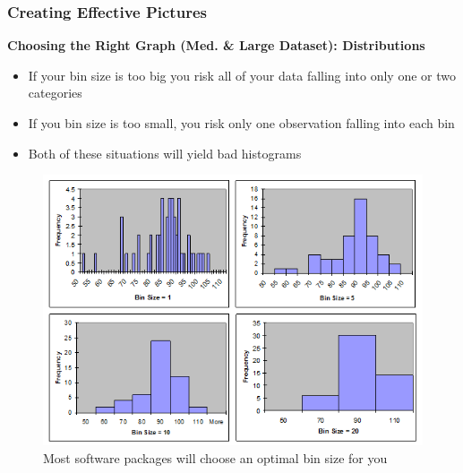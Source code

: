 \documentclass{beamer}
\begin{document}
\begin{frame}
\frametitle{Creating Effective Pictures}
\textbf{Choosing the Right Graph (Med. \& Large Dataset): Distributions}\\
\begin{itemize}
\item If your bin size is too big you risk all of your data falling into only one or two categories
\vspace{0.2cm}
\item If you bin size is too small, you risk only one observation falling into each bin
\vspace{0.2cm}
\item Both of these situations will yield bad histograms 
\end{itemize}
\vspace{-0.2cm}
\begin{figure}
\includegraphics[scale=0.27]{histogram_bin}
\vspace{-0.3cm}
\caption{Most software packages will choose an optimal bin size for you}
\end{figure}
\end{frame}

\end{document}
